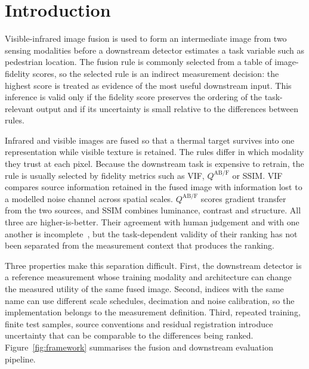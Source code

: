 \documentclass[journal]{IEEEtran}
\begin{document}
\section{Introduction}

Visible-infrared image fusion is used to form an intermediate image from two sensing
modalities before a downstream detector estimates a task variable such as pedestrian
location. The fusion rule is commonly selected from a table of image-fidelity scores,
so the selected rule is an indirect measurement decision: the highest score is treated
as evidence of the most useful downstream input. This inference is valid only if the
fidelity score preserves the ordering of the task-relevant output and if its uncertainty
is small relative to the differences between rules.

Infrared and visible images are fused so that a thermal target survives into one
representation while visible texture is retained. The rules differ in which modality
they trust at each pixel. Because the downstream task is expensive to retrain, the rule
is usually selected by fidelity metrics such as VIF, $Q^{\mathrm{AB/F}}$ or SSIM.
VIF compares source information retained in the fused image with information lost to a
modelled noise channel across spatial scales. $Q^{\mathrm{AB/F}}$ scores gradient
transfer from the two sources, and SSIM combines luminance, contrast and structure. All
three are higher-is-better. Their agreement with human judgement and with one another
is incomplete~\cite{ma2019}, but the task-dependent validity of their ranking has not
been separated from the measurement context that produces the ranking.

Three properties make this separation difficult. First, the downstream detector is a
reference measurement whose training modality and architecture can change the measured
utility of the same fused image. Second, indices with the same name can use different
scale schedules, decimation and noise calibration, so the implementation belongs to the
measurement definition. Third, repeated training, finite test samples, source
conventions and residual registration introduce uncertainty that can be comparable to
the differences being ranked. Figure~\ref{fig:framework} summarises the fusion and
downstream evaluation pipeline.
\end{document}
